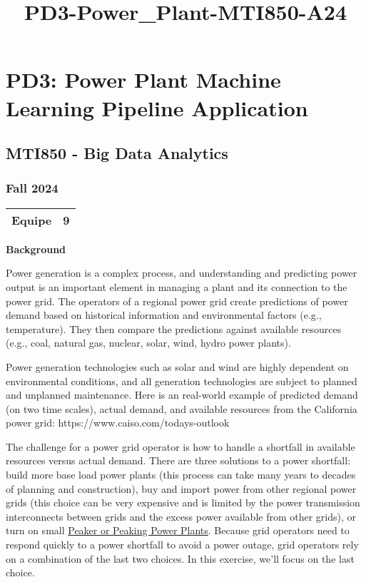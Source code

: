 \documentclass[11pt]{article}
\title{PD3-Power\_Plant-MTI850-A24}
\begin{document}
    
    \maketitle
    
    

    
    \hypertarget{pd3-power-plant-machine-learning-pipeline-application}{%
\section{PD3: Power Plant Machine Learning Pipeline
Application}\label{pd3-power-plant-machine-learning-pipeline-application}}

\hypertarget{mti850---big-data-analytics}{%
\subsection{MTI850 - Big Data
Analytics}\label{mti850---big-data-analytics}}

\hypertarget{fall-2024}{%
\subsubsection{Fall 2024}\label{fall-2024}}

    \begin{longtable}[]{@{}ll@{}}
\toprule
Equipe & 9 \\
\midrule
\endhead
\bottomrule
\end{longtable}

    \textbf{Background}

Power generation is a complex process, and understanding and predicting
power output is an important element in managing a plant and its
connection to the power grid. The operators of a regional power grid
create predictions of power demand based on historical information and
environmental factors (e.g., temperature). They then compare the
predictions against available resources (e.g., coal, natural gas,
nuclear, solar, wind, hydro power plants).

Power generation technologies such as solar and wind are highly
dependent on environmental conditions, and all generation technologies
are subject to planned and unplanned maintenance. Here is an real-world
example of predicted demand (on two time scales), actual demand, and
available resources from the California power grid:
https://www.caiso.com/todays-outlook

The challenge for a power grid operator is how to handle a shortfall in
available resources versus actual demand. There are three solutions to a
power shortfall: build more base load power plants (this process can
take many years to decades of planning and construction), buy and import
power from other regional power grids (this choice can be very expensive
and is limited by the power transmission interconnects between grids and
the excess power available from other grids), or turn on small
\href{https://en.wikipedia.org/wiki/Peaking_power_plant}{Peaker or
Peaking Power Plants}. Because grid operators need to respond quickly to
a power shortfall to avoid a power outage, grid operators rely on a
combination of the last two choices. In this exercise, we'll focus on
the last choice.
\end{document}
